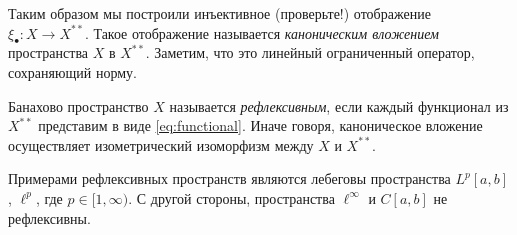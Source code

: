 Таким образом мы построили инъективное (проверьте!) отображение $\xi_\bullet \colon X \to X^{**}$.
Такое отображение называется \emph{каноническим вложением} пространства $X$ в $X^{**}$.
Заметим, что это линейный ограниченный оператор, сохраняющий норму.

\begin{definition}
    Банахово пространство $X$ называется \emph{рефлексивным}, если каждый 
    функционал из $X^{**}$ представим в виде \eqref{eq:functional}. 
    Иначе говоря, каноническое вложение осуществляет изометрический 
    изоморфизм между $X$ и $X^{**}$.
\end{definition}

Примерами рефлексивных пространств являются лебеговы 
пространства $L^p[a,b]$, $\ell^p$, где $p \in [1, \infty)$. 
С другой стороны, пространства $\ell^\infty$ и $C[a, b]$ не рефлексивны.
